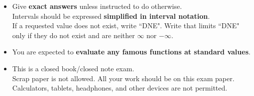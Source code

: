 \documentclass{ximera}
\begin{document}
\begin{examcover}
\begin{itemize}
		\item Give \textbf{exact answers} unless instructed to do otherwise.\\
			Intervals should be expressed \textbf{simplified in interval notation}.\\
			If a requested value does not exist, write ``DNE".
			Write that limits ``DNE" only if they do not exist and are neither $\infty$ nor $-\infty$.
	
		\item You are expected to \textbf{evaluate any famous functions at standard values}.
		
		\item This is a closed book/closed note exam. \\
			Scrap paper is not allowed. All your work should be on this exam paper.\\
			Calculators, tablets, headphones, and other devices are not permitted.
		
	
	

	\end{itemize}
		
	
	\begin{tcolorbox}[colback=white]
		\textbf{SIGN YOUR NAME:}  \mbox{\begin{minipage}{50ex}\hfill\vspace{3em}\end{minipage}}\\
	\end{tcolorbox}
	
	
	\begin{center}
		\renewcommand{\arraystretch}{1.6}
		\gradetable[h][noearned]
	\end{center}
	
	

\end{examcover}
\end{document}
